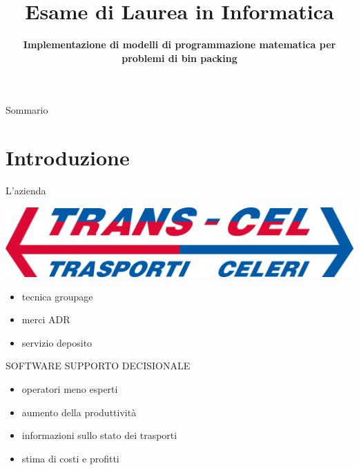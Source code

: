 \documentclass{beamer}
\title{\small{Esame di Laurea in Informatica}}
\subtitle{\textbf{\LARGE{Implementazione di modelli di programmazione matematica per problemi di bin packing}}}
\author[Daniel Rossi]{%
	\usebox{\authbox}
}
\institute{\footnotesize{Dipartimento di Matematica ''Tullio Levi Civita''}}
\date{%
	\usebox{\datebox}
}
\begin{document}
\maketitle

\begin{frame}{Sommario}
	\tableofcontents
\end{frame}

\section{Introduzione}

\begin{frame}{L'azienda}
	\begin{minipage}[c]{0.45\textwidth}
		\includegraphics[width=1\linewidth]{figures/logo-transcel}
	\end{minipage}
	\hfill
	\begin{minipage}[c]{0.45\textwidth}
		\begin{itemize}
			\item tecnica groupage
			\item merci ADR
			\item servizio deposito
		\end{itemize}
	\end{minipage}
			
	\vspace{3.0em}
	\large{\uppercase{Software supporto decisionale}}
	\begin{itemize}
		\item operatori meno esperti
		\item aumento della produttivit\`a
		\item informazioni sullo stato dei trasporti
		\item stima di costi e profitti
	\end{itemize}
\end{frame}
\end{document}
